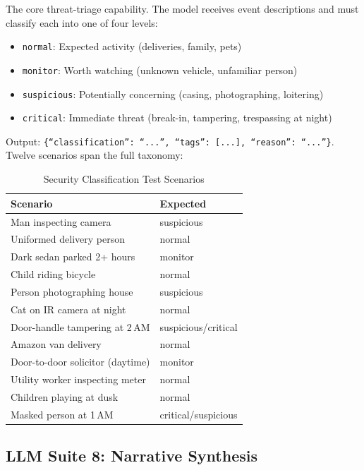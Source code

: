\documentclass[conference]{IEEEtran}
\begin{document}
The core threat-triage capability. The model receives event descriptions
and must classify each into one of four levels:

\begin{itemize}[nosep]
    \item \texttt{normal}: Expected activity (deliveries, family, pets)
    \item \texttt{monitor}: Worth watching (unknown vehicle, unfamiliar
    person)
    \item \texttt{suspicious}: Potentially concerning (casing,
    photographing, loitering)
    \item \texttt{critical}: Immediate threat (break-in, tampering,
    trespassing at night)
\end{itemize}

Output: \texttt{\{``classification'': ``...'', ``tags'': [...],
``reason'': ``...''\}}. Twelve scenarios span the full taxonomy:


\begin{table}[h]
\centering
\caption{Security Classification Test Scenarios}
\label{tab:security_scenarios}
\begin{tabular}{p{3.5cm}l}
\toprule
\textbf{Scenario} & \textbf{Expected} \\
\midrule
Man inspecting camera & suspicious \\
Uniformed delivery person & normal \\
Dark sedan parked 2+ hours & monitor \\
Child riding bicycle & normal \\
Person photographing house & suspicious \\
Cat on IR camera at night & normal \\
Door-handle tampering at 2\,AM & suspicious/critical \\
Amazon van delivery & normal \\
Door-to-door solicitor (daytime) & monitor \\
Utility worker inspecting meter & normal \\
Children playing at dusk & normal \\
Masked person at 1\,AM & critical/suspicious \\
\bottomrule
\end{tabular}
\end{table}

\subsection{LLM Suite 8: Narrative Synthesis}
\end{document}
